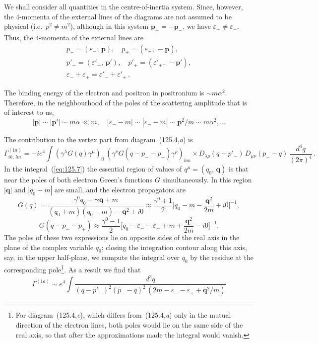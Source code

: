 
We shall consider all quantities in the centre-of-inertia system. Since, however, the 4-momenta of the external lines of the diagrams are not assumed to be physical (i.e.\ $p^2 \neq m^2$), although in this system $\mathbf{p}_+ = -\mathbf{p}_-$, we have $\varepsilon_+ \neq \varepsilon_-$. Thus, the 4-momenta of the external lines are
\begin{equation}
\begin{gathered}
p_- = (\varepsilon_-,\,\mathbf{p}), \quad p_+ = (\varepsilon_+,\,-\mathbf{p}), \\
p'_- = (\varepsilon'_-,\,\mathbf{p}'), \quad p'_+ = (\varepsilon'_+,\,-\mathbf{p}'), \\
\varepsilon_- + \varepsilon_+ = \varepsilon'_- + \varepsilon'_+\,.
\end{gathered}
\label{eq:125.5}
\end{equation}

The binding energy of the electron and positron in positronium is $\sim m\alpha^2$. Therefore, in the neighbourhood of the poles of the scattering amplitude that is of interest to us,
\begin{equation}
|\mathbf{p}| \sim |\mathbf{p}'| \sim m\alpha \ll m, \quad |\varepsilon_- - m| \sim |\varepsilon_+ - m| \sim \mathbf{p}^2/m \sim m\alpha^2, \ldots
\label{eq:125.6}
\end{equation}

The contribution to the vertex part from diagram~(125.4,\textit{a}) is
\begin{equation}
\Gamma^{(1a)}_{ik,\,lm} = -ie^4 \int (\gamma^\lambda G(q)\gamma^\mu)_{il}\,(\gamma^\nu G(q - p_- - p_+)\gamma^\rho)_{km} \times D_{\lambda\rho}(q - p'_-)\,D_{\mu\nu}(p_- - q)\,\frac{d^4 q}{(2\pi)^4}\,.
\label{eq:125.7}
\end{equation}
In the integral~(\ref{eq:125.7}) the essential region of values of $q^\mu = (q_0,\,\mathbf{q})$ is that near the poles of both electron Green's functions $G$ simultaneously. In this region $|\mathbf{q}|$ and $|q_0 - m|$ are small, and the electron propagators are
\[
G(q) = \frac{\gamma^0 q_0 - \boldsymbol{\gamma}\mathbf{q} + m}{(q_0 + m)(q_0 - m) - \mathbf{q}^2 + i0} \approx \frac{\gamma^0 + 1}{2}\biggl[q_0 - m - \frac{\mathbf{q}^2}{2m} + i0\biggr]^{-1},
\]
\begin{equation}
G(q - p_- - p_+) \approx \frac{\gamma^0 - 1}{2}\biggl[q_0 - \varepsilon_- - \varepsilon_+ + m + \frac{\mathbf{q}^2}{2m} - i0\biggr]^{-1}.
\label{eq:125.8}
\end{equation}
The poles of these two expressions lie on opposite sides of the real axis in the plane of the complex variable $q_0$; closing the integration contour along this axis, say, in the upper half-plane, we compute the integral over $q_0$ by the residue at the corresponding pole\footnote{For diagram~(125.4,\textit{e}), which differs from~(125.4,\textit{a}) only in the mutual direction of the electron lines, both poles would lie on the same side of the real axis, so that after the approximations made the integral would vanish.}. As a result we find that
\[
\Gamma^{(1a)} \sim e^4 \int \frac{d^3 q}{(q - p'_-)^2 (p_- - q)^2\,(2m - \varepsilon_- - \varepsilon_+ + \mathbf{q}^2/m)}
\]


